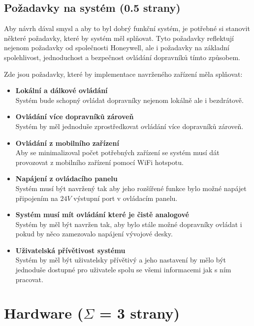 \subsection{Požadavky na systém (0.5 strany)}\label{sec:PozadavkyNaSystem}
Aby návrh dával smysl a aby to byl dobrý funkční systém, je potřebné si stanovit některé požadavky, které by systém měl splňovat. Tyto požadavky reflektují nejenom požadavky od společnosti Honeywell, ale i požadavky na základní spolehlivost, jednoduchost a bezpečnost ovládání dopravníků tímto způsobem.

Zde jsou požadavky, které by implementace navrženého zařízení měla splňovat:

\begin{itemize}
    \item \textbf{Lokální a dálkové ovládání}\\
    Systém bude schopný ovládat dopravníky nejenom lokálně ale i bezdrátově.
    \item \textbf{Ovládání více dopravníků zároveň}\\
    Systém by měl jednoduše zprostředkovat ovládání více dopravníků zároveň.
    \item \textbf{Ovládání z mobilního zařízení}\\
    Aby se minimalizoval počet potřebných zařízení se systém musí dát provozovat z mobilního zařízení pomocí WiFi hotspotu.
    \item \textbf{Napájení z ovládacího panelu}\\
    Systém musí být navržený tak aby jeho rozšířené funkce bylo možné napájet připojením na $24V$ výstupní port v ovládacím panelu.
    \item \textbf{Systém musí mít ovládání které je čistě analogové}\\
    Systém by měl být navržen tak, aby bylo stále možné dopravníky ovládat i pokud by něco zamezovalo napájení vývojové desky.
    \item \textbf{Uživatelská přívětivost systému}\\
    Systém by měl být uživatelsky přívětivý a jeho nastavení by mělo být jednoduše dostupné pro uživatele spolu se všemi informacemi jak s ním pracovat.
\end{itemize}

\oldtext

\section{Hardware ($\Sigma$ = 3 strany)}\label{sec:Hardware}

